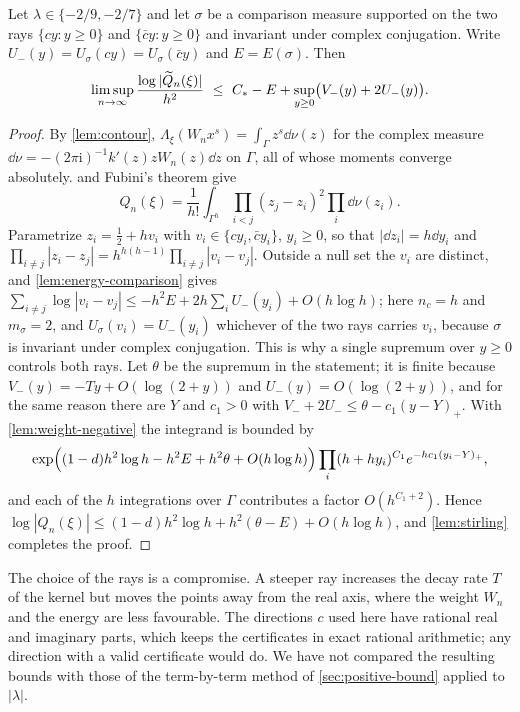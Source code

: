 \begin{proposition}\label{prop:negative-bound}
Let $\lambda\in\{-2/9,-2/7\}$ and let $\sigma$ be a comparison measure supported on the two rays $\{cy:y\ge0\}$ and $\{\bar cy:y\ge0\}$ and invariant under complex conjugation. Write $U_-(y)=U_\sigma(cy)=U_\sigma(\bar cy)$ and $E=E(\sigma)$. Then
\[
\limsup_{n\to\infty}\frac{\log|\Qt_n(\xi)|}{h^2}\ \le\ \Cst-E+\sup_{y\ge0}\bigl(V_-(y)+2U_-(y)\bigr).
\]
\end{proposition}

\begin{proof}
By \cref{lem:contour}, $\Lambda_\xi(W_nx^s)=\int_\Gamma z^s\dd\nu(z)$ for the complex measure $\dd\nu=-(2\pi\mathrm i)^{-1}k'(z)zW_n(z)\dd z$ on $\Gamma$, all of whose moments converge absolutely.  and Fubini's theorem give
\[
Q_n(\xi)=\frac1{h!}\int_{\Gamma^h}\prod_{i<j}(z_j-z_i)^2\prod_i\dd\nu(z_i).
\]
Parametrize $z_i=\frac12+hv_i$ with $v_i\in\{cy_i,\bar cy_i\}$, $y_i\ge0$, so that $|\dd z_i|=h\dd y_i$ and $\prod_{i\ne j}|z_i-z_j|=h^{h(h-1)}\prod_{i\ne j}|v_i-v_j|$. Outside a null set the $v_i$ are distinct, and \cref{lem:energy-comparison} gives $\sum_{i\ne j}\log|v_i-v_j|\le-h^2E+2h\sum_iU_-(y_i)+O(h\log h)$; here $n_c=h$ and $m_\sigma=2$, and $U_\sigma(v_i)=U_-(y_i)$ whichever of the two rays carries $v_i$, because $\sigma$ is invariant under complex conjugation. This is why a single supremum over $y\ge0$ controls both rays. Let $\theta$ be the supremum in the statement; it is finite because $V_-(y)=-Ty+O(\log(2+y))$ and $U_-(y)=O(\log(2+y))$, and for the same reason there are $Y$ and $c_1>0$ with $V_-+2U_-\le\theta-c_1(y-Y)_+$. With \cref{lem:weight-negative} the integrand is bounded by
\[
\exp\Bigl((1-d)h^2\log h-h^2E+h^2\theta+O(h\log h)\Bigr)\prod_i(h+hy_i)^{C_1}e^{-hc_1(y_i-Y)_+},
\]
and each of the $h$ integrations over $\Gamma$ contributes a factor $O(h^{C_1+2})$. Hence $\log|Q_n(\xi)|\le(1-d)h^2\log h+h^2(\theta-E)+O(h\log h)$, and \cref{lem:stirling} completes the proof.
\end{proof}

\begin{remark}
The choice of the rays is a compromise. A steeper ray increases the decay rate $T$ of the kernel but moves the points away from the real axis, where the weight $W_n$ and the energy are less favourable. The directions $c$ used here have rational real and imaginary parts, which keeps the certificates in exact rational arithmetic; any direction with a valid certificate would do. We have not compared the resulting bounds with those of the term-by-term method of \cref{sec:positive-bound} applied to $|\lambda|$.
\end{remark}
